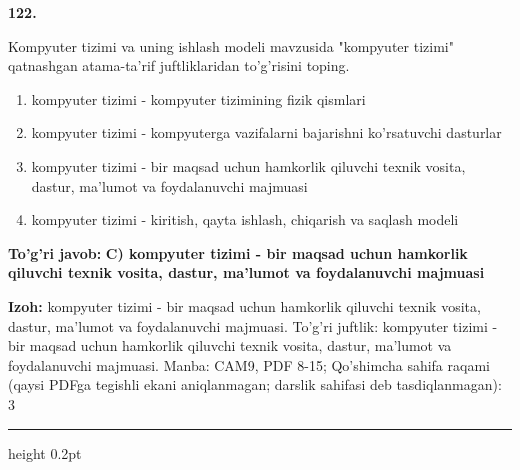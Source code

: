 \documentclass[10pt,a4paper]{article}
\begin{document}
{\bfseries\sffamily\color{ink} 122.}
\par
Kompyuter tizimi va uning ishlash modeli mavzusida "kompyuter tizimi" qatnashgan atama-ta'rif juftliklaridan to'g'risini toping.
\begin{enumerate}[label=\Alph*),leftmargin=9mm]
\item kompyuter tizimi - kompyuter tizimining fizik qismlari
\item kompyuter tizimi - kompyuterga vazifalarni bajarishni ko'rsatuvchi dasturlar
\item kompyuter tizimi - bir maqsad uchun hamkorlik qiluvchi texnik vosita, dastur, ma'lumot va foydalanuvchi majmuasi
\item kompyuter tizimi - kiritish, qayta ishlash, chiqarish va saqlash modeli
\end{enumerate}
\begin{tcolorbox}[enhanced,breakable,colback=teal!4,colframe=teal!60!black,boxrule=0.45pt,arc=1.2mm,left=2.7mm,right=2.7mm,top=1.8mm,bottom=1.8mm,before skip=2mm,after skip=2mm]
{\bfseries\sffamily\color{teal}To'g'ri javob:} \textbf{C) kompyuter tizimi - bir maqsad uchun hamkorlik qiluvchi texnik vosita, dastur, ma'lumot va foydalanuvchi majmuasi}
\par\smallskip
{\bfseries Izoh:} kompyuter tizimi - bir maqsad uchun hamkorlik qiluvchi texnik vosita, dastur, ma'lumot va foydalanuvchi majmuasi. To'g'ri juftlik: kompyuter tizimi - bir maqsad uchun hamkorlik qiluvchi texnik vosita, dastur, ma'lumot va foydalanuvchi majmuasi. Manba: CAM9, PDF 8-15; Qo'shimcha sahifa raqami (qaysi PDFga tegishli ekani aniqlanmagan; darslik sahifasi deb tasdiqlanmagan): 3
\end{tcolorbox}
\vspace{2mm}\hrule height 0.2pt\vspace{3mm}
\end{document}
